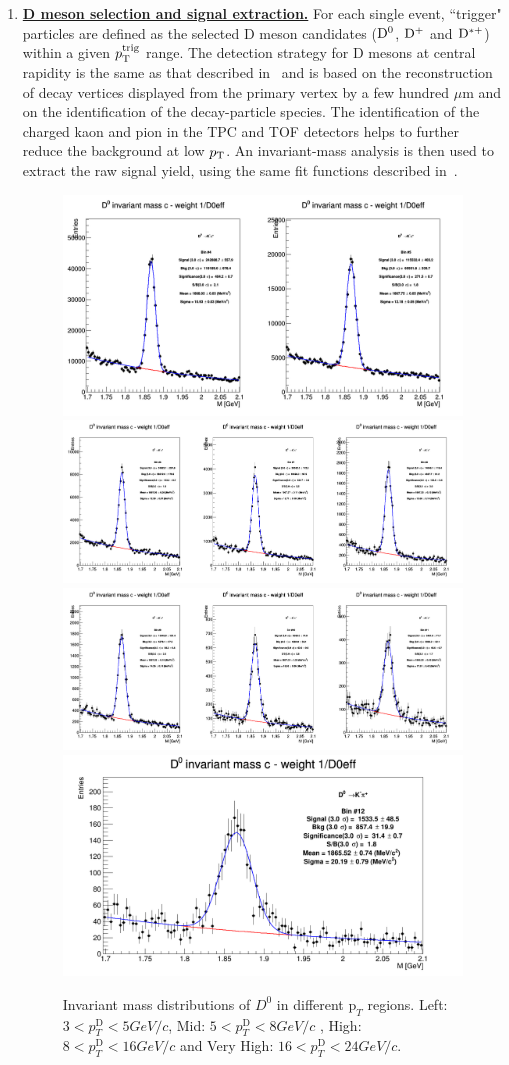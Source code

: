 \begin{enumerate}

\item
\underline {\bf D meson selection and signal extraction.}  For each single event, ``trigger" particles
are defined as the selected  D meson candidates (${\rm D^0}$, ${\rm D^+}$ and ${\rm D^{*+}}$)
within a given $p_{\rm T}^{\rm trig}$ range. The detection strategy for D mesons at central rapidity is
the same as that described in~\cite{ALICEDmespp7Tev} and is based on the reconstruction of decay
vertices displayed from the primary vertex by a few hundred $\mu$m and on the identification of the decay-particle species.
The identification of the charged kaon and pion in the TPC and TOF
detectors helps to further reduce the background at low $p_{\rm T}$.  An
invariant-mass analysis is then used to extract the raw signal yield, using
the same fit functions described in~\cite{ALICEDmespp7Tev}.


\begin{figure}[h]
\centering

{\includegraphics[width=.32\linewidth]{figures/Dzero/InvMassDistributions_Dzero_Bins4to5.png}}
{\includegraphics[width=.32\linewidth]{figures/Dzero/InvMassDistributions_Dzero_Bins6to8.png}}
{\includegraphics[width=.32\linewidth]{figures/Dzero/InvMassDistributions_Dzero_Bins9to11.png}}
{\includegraphics[width=.32\linewidth]{figures/Dzero/InvMassDistributions_Dzero_Bins12to12.png}}



\caption{Invariant mass distributions of $D^0$ in different $\text{p}_T$ regions. Left: $3< p_{T}^{\text{D}}< 5 GeV/c$, Mid: $5< p_{T}^{\text{D}}< 8 GeV/c$ , High: $8< p_{T}^{\text{D}}< 16 GeV/c$ and Very High: $16<p_{T}^{\text{D}}< 24 GeV/c$.}
\label{fig:InvMass}
\end{figure}


\end{enumerate}
